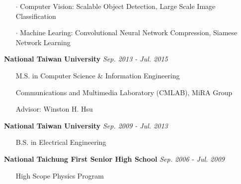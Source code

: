 \documentclass{joel_cv}
\begin{document}
\begin{center} 
\end{center}

%
%

\vspace{1em}
\begin{itemize}
	\itemsep=-0.5em
	\item[$\cdot$] Computer Vision: Scalable Object Detection, Large Scale Image Classification
	\item[$\cdot$] Machine Learing: Convolutional Neural Network Compression, Siamese Network Learning
\end{itemize}


%
%

\vspace{1em}

\hspace{1.2em}
{\bf National Taiwan University} \hfill {\em Sep. 2013 - Jul. 2015}
\vspace{-0.5em}
\begin{itemize}[leftmargin=1.5em]
	\itemsep=-0.5em
	\item[] M.S. in Computer Science \& Information Engineering
	\item[] Communications and Multimedia Laboratory (CMLAB), MiRA Group
	\item[] Advisor: Winston H. Hsu
\end{itemize}

%
\noindent \hspace{1.2em}
{\bf National Taiwan University} \hfill {\em Sep. 2009 - Jul. 2013}
\vspace{-0.5em}
\begin{itemize}[leftmargin=1.5em]
	\itemsep=-0.5em
	\item[] B.S. in Electrical Engineering
\end{itemize}

%
\noindent \hspace{1.2em}
{\bf National Taichung First Senior High School} \hfill {\em Sep. 2006 - Jul. 2009}
\vspace{-0.5em}
\begin{itemize}[leftmargin=1.5em]
	\itemsep=-0.5em
	\item[] High Scope Physics Program
\end{itemize}
\end{document}
